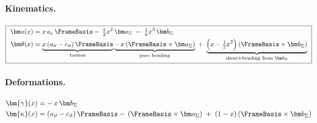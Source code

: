 
\paragraph{Kinematics.}
\begin{equation*}
\boxed{\ 
\begin{aligned}
\bm u(x)&= x\,a_\varepsilon\,\FrameBasis
-\,\tfrac{1}{2} x^2\,\bm a_\Sigma\;-\;\tfrac16 x^3\,\bm b_\Sigma\\
\bm\theta(x)&=
\underbrace{x\,(a_\vartheta-c_\vartheta)\,\FrameBasis}_{\text{torsion}}
\underbrace{-\,x\,(\FrameBasis\times\bm a_\Sigma)}_{\text{pure bending}}
\;+\;\underbrace{\Big(x-\tfrac{1}{2} x^2\Big)\,(\FrameBasis\times\bm b_\Sigma)}_{\text{shear+bending from }\bm b_\Sigma}
\end{aligned}\ }
\end{equation*}

\paragraph{Deformations.}
\begin{equation*}
\begin{aligned}
\bm{\gamma}(x)&= -\,x\,\bm b_\Sigma \\
\bm{\kappa}(x)&= 
(a_\vartheta-c_\vartheta)\,\FrameBasis
-\,(\FrameBasis\times\bm a_\Sigma)\;+\;(1-x)\,(\FrameBasis\times\bm b_\Sigma)\\
\end{aligned}
\end{equation*}

